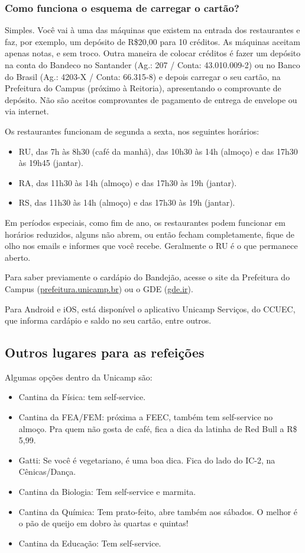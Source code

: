 \subsubsection{Como funciona o esquema de carregar o cartão?}

Simples. Você vai à uma das máquinas que existem na entrada dos restaurantes e
faz, por exemplo, um depósito de R\$20,00 para 10 créditos. As máquinas aceitam
apenas notas, e sem troco. Outra maneira de colocar créditos é fazer um depósito
na conta do Bandeco no Santander (Ag.: 207 / Conta: 43.010.009-2) ou no Banco do
Brasil (Ag.: 4203-X / Conta: 66.315-8) e depois carregar o seu cartão, na
Prefeitura do Campus (próximo à Reitoria), apresentando o comprovante de
depósito. Não são aceitos comprovantes de pagamento de entrega de envelope ou
via internet.

Os restaurantes funcionam de segunda a sexta, nos seguintes horários:

\begin{itemize}
\item RU, das 7h às 8h30 (café da manhã), das 10h30 às 14h (almoço) e
  das 17h30 às 19h45 (jantar).
\item RA, das 11h30 às 14h (almoço) e das 17h30 às 19h (jantar).
\item RS, das 11h30 às 14h (almoço) e das 17h30 às 19h (jantar).
\end{itemize}

Em períodos especiais, como fim de ano, os restaurantes podem funcionar em
horários reduzidos, alguns não abrem, ou então fecham completamente, fique de
olho nos emails e informes que você recebe. Geralmente o RU é o que permanece
aberto.

Para saber previamente o cardápio do Bandejão, acesse o site da Prefeitura do
Campus (\url{prefeitura.unicamp.br}) ou o GDE (\url{gde.ir}).

Para Android e iOS, está disponível o aplicativo Unicamp Serviços, do CCUEC, que
informa cardápio e saldo no seu cartão, entre outros.

\subsection{Outros lugares para as refeições}

Algumas opções dentro da Unicamp são:

\begin{itemize}
\item Cantina da Física: tem self-service.
\item Cantina da FEA/FEM: próxima a FEEC, também tem self-service no almoço. Pra
  quem não gosta de café, fica a dica da latinha de Red Bull a R\$ 5,99.
\item Gatti: Se você é vegetariano, é uma boa dica. Fica do lado do IC-2, na
  Cênicas/Dança.
\item Cantina da Biologia: Tem self-service e marmita.
\item Cantina da Química:  Tem prato-feito, abre também aos sábados. O melhor é 
  o pão de queijo em dobro às quartas e quintas!
\item Cantina da Educação: Tem self-service.
\end {itemize}

